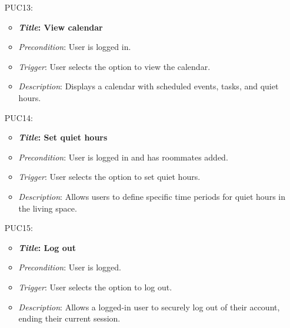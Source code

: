 \documentclass[12pt]{article}
\begin{document}
\begin{itemize}
    \item[PUC13:]
        \begin{itemize}
            \item \textbf{\textit{Title}: View calendar}
            \item \textit{Precondition}: User is logged in.
            \item \textit{Trigger}: User selects the option to view the calendar.
            \item \textit{Description}: Displays a calendar with scheduled events, tasks, and quiet hours.
    \end{itemize}

    \item[PUC14:]
        \begin{itemize}
            \item \textbf{\textit{Title}: Set quiet hours}
            \item \textit{Precondition}: User is logged in and has roommates added.
            \item \textit{Trigger}: User selects the option to set quiet hours.
            \item \textit{Description}: Allows users to define specific time periods for quiet hours in the living space.
    \end{itemize}

    \item[PUC15:]
        \begin{itemize}
            \item \textbf{\textit{Title}: Log out}
            \item \textit{Precondition}: User is logged.
            \item \textit{Trigger}: User selects the option to log out.
            \item \textit{Description}: Allows a logged-in user to securely log out of their account, ending their current session.
    \end{itemize}


\end{itemize}
\end{document}
